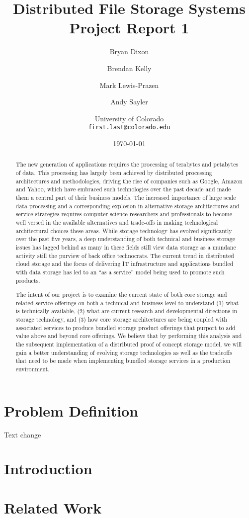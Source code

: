 \documentclass[11pt]{article}
\begin{document}
\title{
  Distributed File Storage Systems\\
  Project Report 1
}
\author{
  Bryan Dixon \and Brendan Kelly \and Mark Lewis-Prazen \and Andy Sayler\\
  \and University of Colorado\\
  \texttt{first.last@colorado.edu}
}
\date{\today}

\maketitle

\begin{abstract}
The new generation of applications requires the processing of terabytes and petabytes of data. This processing has 
largely been achieved by distributed processing architectures and methodologies, driving the rise of companies such as 
Google, Amazon and Yahoo, which have embraced such technologies over the past decade and made them a central part of 
their business models. The increased importance of large scale data processing and a corresponding explosion in 
alternative storage architectures and service strategies requires computer science researchers and professionals to 
become well versed in the available alternatives and trade-offs in making technological architectural choices these 
areas. While storage technology has evolved significantly over the past five years, a deep understanding of both 
technical and business storage issues has lagged behind as many in these fields still view data storage as a mundane 
activity still the purview of back office technocrats. The current trend in distributed cloud storage and the focus of 
delivering IT infrastructure and applications bundled with data storage has led to an “as a service” model being used 
to promote such products.

The intent of our project is to examine the current state of both core storage and related service offerings on both a 
technical and business level to understand (1) what is technically available, (2) what are current research and 
developmental directions in storage technology, and (3) how core storage architectures are being coupled with associated
services to produce bundled storage product offerings that purport to add value above and beyond core offerings. We 
believe that by performing this analysis and the subsequent implementation of a distributed proof of concept storage 
model, we will gain a better understanding of evolving storage technologies as well as the tradeoffs that need to be 
made when implementing bundled storage services in a production environment.

\end{abstract}

\newpage

\section{Problem Definition}
Text change

\section{Introduction}


\section{Related Work}


\nocite{*}

\end{document}
